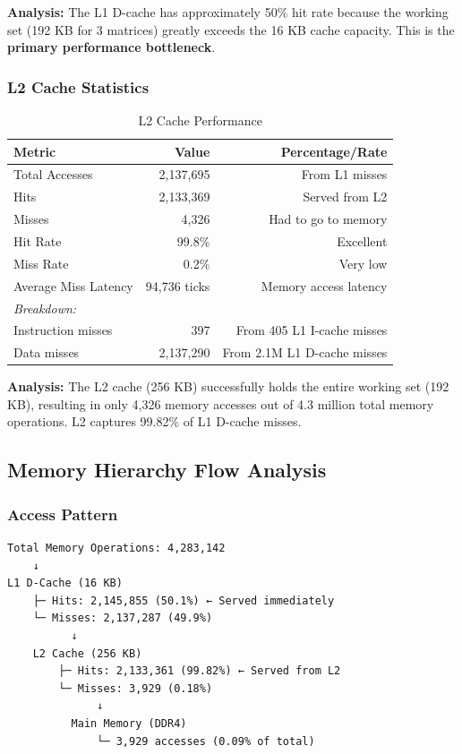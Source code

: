 \documentclass[11pt,a4paper]{article}
\begin{document}
\textbf{Analysis:} The L1 D-cache has approximately 50\% hit rate because the working set (192 KB for 3 matrices) greatly exceeds the 16 KB cache capacity. This is the \textbf{primary performance bottleneck}.

\subsubsection{L2 Cache Statistics}

\begin{table}[H]
\centering
\caption{L2 Cache Performance}
\begin{tabular}{lrr}
\toprule
\textbf{Metric} & \textbf{Value} & \textbf{Percentage/Rate} \\
\midrule
Total Accesses & 2,137,695 & From L1 misses \\
Hits & 2,133,369 & Served from L2 \\
Misses & 4,326 & Had to go to memory \\
Hit Rate & 99.8\% & Excellent \\
Miss Rate & 0.2\% & Very low \\
Average Miss Latency & 94,736 ticks & Memory access latency \\
\midrule
\multicolumn{3}{l}{\textit{Breakdown:}} \\
Instruction misses & 397 & From 405 L1 I-cache misses \\
Data misses & 2,137,290 & From 2.1M L1 D-cache misses \\
\bottomrule
\end{tabular}
\end{table}

\textbf{Analysis:} The L2 cache (256 KB) successfully holds the entire working set (192 KB), resulting in only 4,326 memory accesses out of 4.3 million total memory operations. L2 captures 99.82\% of L1 D-cache misses.

\subsection{Memory Hierarchy Flow Analysis}

\subsubsection{Access Pattern}

\begin{verbatim}
Total Memory Operations: 4,283,142
    ↓
L1 D-Cache (16 KB)
    ├─ Hits: 2,145,855 (50.1%) ← Served immediately
    └─ Misses: 2,137,287 (49.9%)
          ↓
    L2 Cache (256 KB)
        ├─ Hits: 2,133,361 (99.82%) ← Served from L2
        └─ Misses: 3,929 (0.18%)
              ↓
          Main Memory (DDR4)
              └─ 3,929 accesses (0.09% of total)
\end{verbatim}
\end{document}
